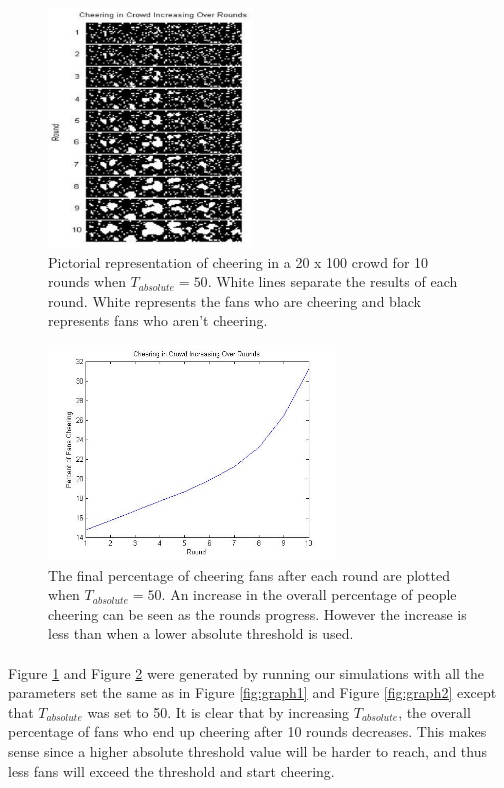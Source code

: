 \documentclass[oneside,12pt]{report}
\begin{document}
\begin{figure}[h]
    \begin{center}
        \includegraphics[height=2.5in]{sample_graph3.jpg}
    \end{center}
    \caption[Pictorial representation of the progression of cheering over time with a higher absolute threshold.]{Pictorial representation of cheering in a 20 x 100 crowd for 10 rounds when $T_{absolute}=50$. White lines separate the results of each round. White represents the fans who are cheering and black represents fans who aren't cheering.}
    \label{fig:graph3}
\end{figure}

\begin{figure}[h]
    \begin{center}
        \includegraphics[width=3in]{sample_graph4.jpg}
    \end{center}
    \caption[Plot of cheering levels over time in a simulated crowd with a higher absolute threshold.]{The final percentage of cheering fans after each round are plotted when $T_{absolute}=50$. An increase in the overall percentage of people cheering can be seen as the rounds progress. However the increase is less than when a lower absolute threshold is used.}
    \label{fig:graph4}
\end{figure}

\paragraph{}
Figure \ref{fig:graph3} and Figure \ref{fig:graph4} were generated by running our simulations with all the parameters set the same as in Figure \ref{fig:graph1} and Figure \ref{fig:graph2} except that $T_{absolute}$ was set to 50. It is clear that by increasing $T_{absolute}$, the overall percentage of fans who end up cheering after 10 rounds decreases. This makes sense since a higher absolute threshold value will be harder to reach, and thus less fans will exceed the threshold and start cheering. 
\end{document}
